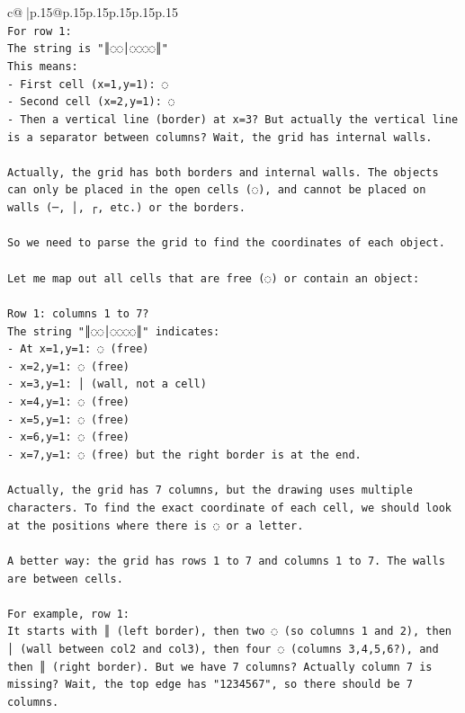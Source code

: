 \documentclass{article}
\begin{document}
{\begin{supertabular}{c@{$\;$}|p{.15\linewidth}@{}p{.15\linewidth}p{.15\linewidth}p{.15\linewidth}p{.15\linewidth}p{.15\linewidth}}
{{{\\ 
\texttt{For row 1: } \\
\texttt{The string is "║◌◌│◌◌◌◌║"} \\
\texttt{This means:} \\
\texttt{{-} First cell (x=1,y=1): ◌} \\
\texttt{{-} Second cell (x=2,y=1): ◌} \\
\texttt{{-} Then a vertical line (border) at x=3? But actually the vertical line is a separator between columns? Wait, the grid has internal walls.} \\
\\ 
\texttt{Actually, the grid has both borders and internal walls. The objects can only be placed in the open cells (◌), and cannot be placed on walls (─, │, ┌, etc.) or the borders.} \\
\\ 
\texttt{So we need to parse the grid to find the coordinates of each object.} \\
\\ 
\texttt{Let me map out all cells that are free (◌) or contain an object:} \\
\\ 
\texttt{Row 1: columns 1 to 7?} \\
\texttt{The string "║◌◌│◌◌◌◌║" indicates:} \\
\texttt{{-} At x=1,y=1: ◌ (free)} \\
\texttt{{-} x=2,y=1: ◌ (free)} \\
\texttt{{-} x=3,y=1: │ (wall, not a cell)} \\
\texttt{{-} x=4,y=1: ◌ (free)} \\
\texttt{{-} x=5,y=1: ◌ (free)} \\
\texttt{{-} x=6,y=1: ◌ (free)} \\
\texttt{{-} x=7,y=1: ◌ (free) but the right border is at the end.} \\
\\ 
\texttt{Actually, the grid has 7 columns, but the drawing uses multiple characters. To find the exact coordinate of each cell, we should look at the positions where there is ◌ or a letter.} \\
\\ 
\texttt{A better way: the grid has rows 1 to 7 and columns 1 to 7. The walls are between cells.} \\
\\ 
\texttt{For example, row 1: } \\
\texttt{It starts with ║ (left border), then two ◌ (so columns 1 and 2), then │ (wall between col2 and col3), then four ◌ (columns 3,4,5,6?), and then ║ (right border). But we have 7 columns? Actually column 7 is missing? Wait, the top edge has "1234567", so there should be 7 columns.} \\
}}}
\end{supertabular}}
\end{document}

